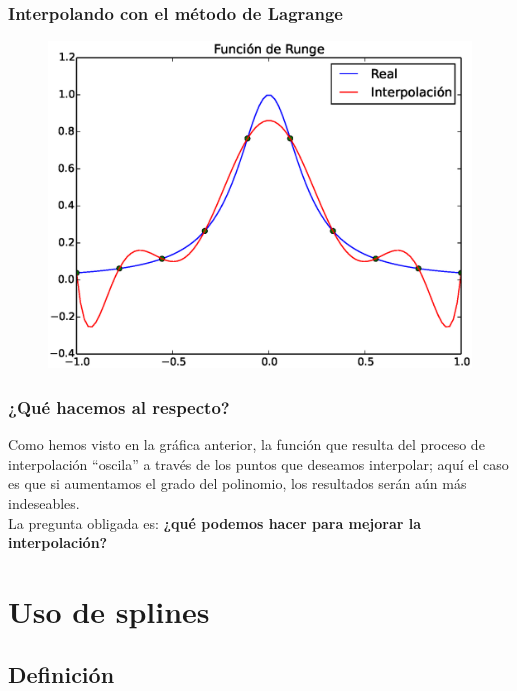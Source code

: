 \documentclass[12pt]{beamer}
\begin{document}
\begin{frame}
\frametitle{Interpolando con el método de Lagrange}
\begin{figure}
	\centering
	\includegraphics[scale=0.45]{Imagenes/Funcion_Runge_03.eps} 
\end{figure}
\end{frame}
\begin{frame}
\frametitle{¿Qué hacemos al respecto?}
Como hemos visto en la gráfica anterior, la función que resulta del proceso de interpolación \enquote{oscila} a través de los puntos que deseamos interpolar; aquí el caso es que si aumentamos el grado del polinomio, los resultados serán aún más indeseables.
\\
\medskip
\pause
La pregunta obligada es: \textbf{¿qué podemos hacer para mejorar la interpolación?}
\end{frame}

\section{Uso de splines}
\subsection{Definición}
\end{document}
